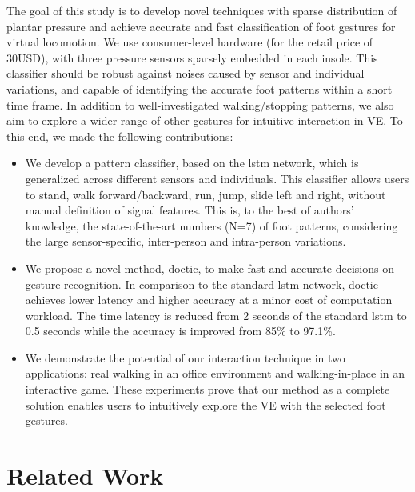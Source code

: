 \documentclass[review]{vgtc}                 %
\begin{document}
The goal of this study is to develop novel techniques with sparse distribution of plantar pressure and achieve accurate and fast classification of foot gestures for virtual locomotion.
We use consumer-level hardware (for the retail price of 30USD), with three pressure sensors sparsely embedded in each insole.
This classifier should be robust against noises caused by sensor and individual variations, and capable of identifying the accurate foot patterns within a short time frame.	
In addition to well-investigated walking/stopping patterns, we also aim to explore a wider range of other gestures for intuitive interaction in VE.
To this end, we made the following contributions:
\begin{itemize}
	\item We develop a pattern classifier, based on the \acf{lstm} network, which is generalized across different sensors and individuals. This classifier allows users to stand, walk forward/backward, run, jump, slide left and right, without manual definition of signal features. This is, to the best of authors' knowledge, the state-of-the-art numbers (N=7) of foot patterns, considering the large sensor-specific, inter-person and intra-person variations.
	\item We propose a novel method, \acf{doctic}, to make fast and accurate decisions on gesture recognition.
	In comparison to the standard \acs{lstm} network, \acs{doctic} achieves lower latency and higher accuracy at a minor cost of computation workload.
	The time latency is reduced from 2 seconds of the standard \acs{lstm} to 0.5 seconds while the accuracy is improved from 85\% to 97.1\%.
	\item We demonstrate the potential of our interaction technique in two applications: real walking in an office environment and walking-in-place in an interactive game. These experiments prove that our method as a complete solution enables users to intuitively explore the VE with the selected foot gestures. 

\end{itemize}


\section{Related Work}
\end{document}
